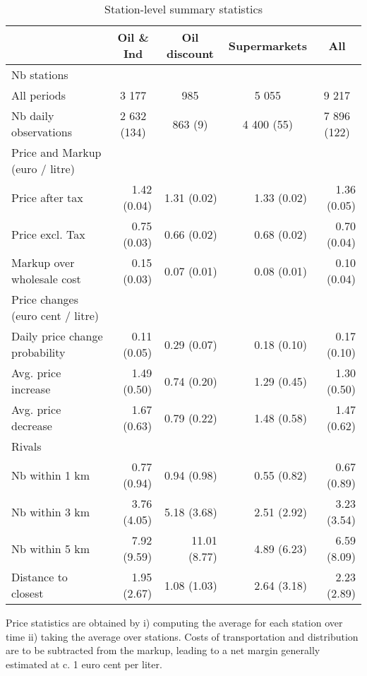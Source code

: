 \documentclass[english]{article}
\begin{document}
\begin{table}
\begin{threeparttable}
\renewcommand{\arraystretch}{0.8} %
\caption{Station-level summary statistics}
\label{tab:station_stats_des}
    \begin{tabular}{lrrrr}
    \toprule
    \toprule
          & \multicolumn{1}{c}{Oil \& Ind} & \multicolumn{1}{c}{Oil discount} & \multicolumn{1}{c}{Supermarkets} & \multicolumn{1}{c}{All} \\
    \midrule
    Nb stations &       &       &       &  \\
    All periods & \multicolumn{1}{c}{3 177} & \multicolumn{1}{c}{985} & \multicolumn{1}{c}{5 055} & \multicolumn{1}{c}{9 217} \\
    Nb daily observations & \multicolumn{1}{c}{2 632 (134)} & \multicolumn{1}{c}{863 (9)} & \multicolumn{1}{c}{4 400 (55)} & \multicolumn{1}{c}{7 896 (122)} \\
    \midrule
    Price and Markup (euro / litre) &       &       &       &  \\
    Price after tax & 1.42 (0.04) & 1.31 (0.02) & 1.33 (0.02) & 1.36 (0.05) \\
    Price excl. Tax & 0.75 (0.03) & 0.66 (0.02) & 0.68 (0.02) & 0.70 (0.04) \\
    Markup over wholesale cost & 0.15 (0.03) & 0.07 (0.01) & 0.08 (0.01) & 0.10 (0.04) \\
    \midrule
    Price changes (euro cent / litre) &       &       &       &  \\
    Daily price change probability & 0.11 (0.05) & 0.29 (0.07) & 0.18 (0.10) & 0.17 (0.10) \\
    Avg. price increase & 1.49 (0.50) & 0.74 (0.20) & 1.29 (0.45) & 1.30 (0.50) \\
    Avg. price decrease & 1.67 (0.63) & 0.79 (0.22) & 1.48 (0.58) & 1.47 (0.62) \\
    \midrule
    Rivals &       &       &       &  \\
    Nb within 1 km & 0.77 (0.94) & 0.94 (0.98) & 0.55 (0.82) & 0.67 (0.89) \\
    Nb within 3 km & 3.76 (4.05) & 5.18 (3.68) & 2.51 (2.92) & 3.23 (3.54) \\
    Nb within 5 km & 7.92 (9.59) & 11.01 (8.77) & 4.89 (6.23) & 6.59 (8.09) \\
    Distance to closest & 1.95 (2.67) & 1.08 (1.03) & 2.64 (3.18) & 2.23 (2.89) \\
   \bottomrule
   \bottomrule
\end{tabular}
\begin{tablenotes}
			\small
      \item Price statistics are obtained by i) computing the average for each station over time ii) taking the average over stations. Costs of transportation and distribution are to be subtracted from the markup, leading to a net margin generally estimated at c. 1 euro cent per liter.
\end{tablenotes}
\end{threeparttable}
\end{table}
\end{document}
